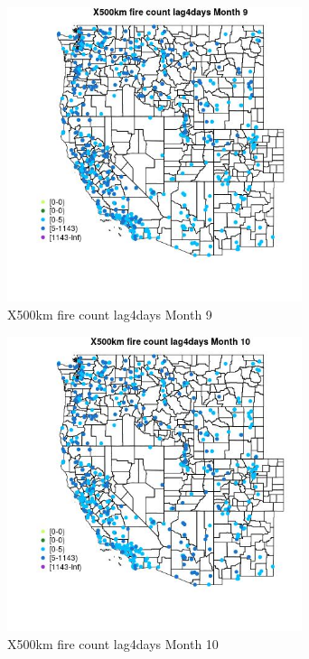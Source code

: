 \begin{figure} 
\centering  
\includegraphics[width=0.77\textwidth]{Code_Outputs/Report_ML_input_PM25_Step4_part_e_de_duplicated_aves_compiled_2019-05-14wNAs_MapObsMo9X500km_fire_count_lag4days.jpg} 
\caption{\label{fig:Report_ML_input_PM25_Step4_part_e_de_duplicated_aves_compiled_2019-05-14wNAsMapObsMo9X500km_fire_count_lag4days}X500km fire count lag4days Month 9} 
\end{figure} 
 

\begin{figure} 
\centering  
\includegraphics[width=0.77\textwidth]{Code_Outputs/Report_ML_input_PM25_Step4_part_e_de_duplicated_aves_compiled_2019-05-14wNAs_MapObsMo10X500km_fire_count_lag4days.jpg} 
\caption{\label{fig:Report_ML_input_PM25_Step4_part_e_de_duplicated_aves_compiled_2019-05-14wNAsMapObsMo10X500km_fire_count_lag4days}X500km fire count lag4days Month 10} 
\end{figure} 
 

